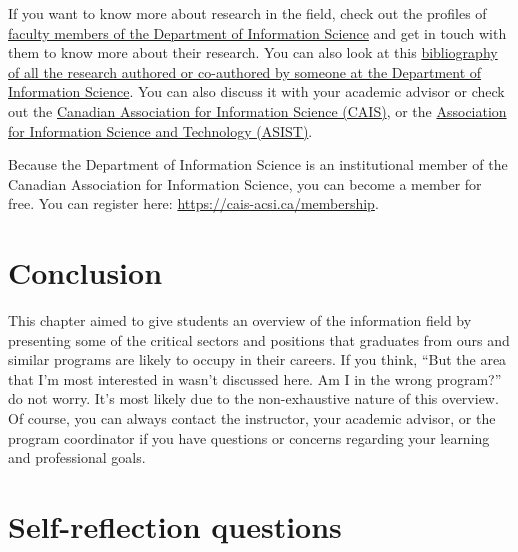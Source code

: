 \documentclass[
  letterpaper,
  DIV=11,
  numbers=noendperiod]{scrreprt}
\begin{document}
If you want to know more about research in the field, check out the
profiles of
\href{https://www.dal.ca/faculty/management/faculty-staff/information-science.html}{faculty
members of the Department of Information Science} and get in touch with
them to know more about their research. You can also look at this
\href{https://www.zotero.org/groups/sim_research/library/}{bibliography
of all the research authored or co-authored by someone at the Department
of Information Science}. You can also discuss it with your academic
advisor or check out the \href{https://cais-acsi.ca/}{Canadian
Association for Information Science (CAIS)}, or the
\href{https://www.asist.org/}{Association for Information Science and
Technology (ASIST)}.

\begin{tcolorbox}[enhanced jigsaw, arc=.35mm, bottomrule=.15mm, bottomtitle=1mm, breakable, colback=white, colbacktitle=quarto-callout-tip-color!10!white, colframe=quarto-callout-tip-color-frame, coltitle=black, left=2mm, leftrule=.75mm, opacityback=0, opacitybacktitle=0.6, rightrule=.15mm, title=\textcolor{quarto-callout-tip-color}{\faLightbulb}\hspace{0.5em}{Did you know?}, titlerule=0mm, toprule=.15mm, toptitle=1mm]

Because the Department of Information Science is an institutional member
of the Canadian Association for Information Science, you can become a
member for free. You can register here:
\url{https://cais-acsi.ca/membership}.

\end{tcolorbox}

\section{Conclusion}\label{conclusion}

This chapter aimed to give students an overview of the information field
by presenting some of the critical sectors and positions that graduates
from ours and similar programs are likely to occupy in their careers. If
you think, ``But the area that I'm most interested in wasn't discussed
here. Am I in the wrong program?'' do not worry. It's most likely due to
the non-exhaustive nature of this overview. Of course, you can always
contact the instructor, your academic advisor, or the program
coordinator if you have questions or concerns regarding your learning
and professional goals.

\section{Self-reflection questions}\label{self-reflection-questions}
\end{document}
